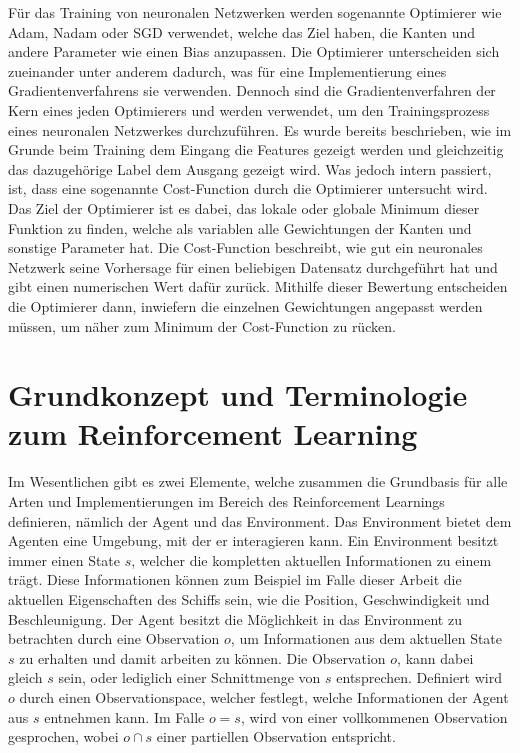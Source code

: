 \documentclass[]{iat}
\begin{document}
Für das Training von neuronalen Netzwerken werden sogenannte Optimierer wie Adam, Nadam oder SGD verwendet, welche das Ziel haben, die Kanten und andere Parameter wie einen Bias anzupassen. Die Optimierer unterscheiden sich zueinander unter anderem dadurch, was für eine Implementierung eines Gradientenverfahrens sie verwenden. Dennoch sind die Gradientenverfahren der Kern eines jeden Optimierers und werden verwendet, um den Trainingsprozess eines neuronalen Netzwerkes durchzuführen. Es wurde bereits beschrieben, wie im Grunde beim Training dem Eingang die Features gezeigt werden und gleichzeitig das dazugehörige Label dem Ausgang gezeigt wird. Was jedoch intern passiert, ist, dass eine sogenannte Cost-Function durch die Optimierer untersucht wird. Das Ziel der Optimierer ist es dabei, das lokale oder globale Minimum dieser Funktion zu finden, welche als variablen alle Gewichtungen der Kanten und sonstige Parameter hat. Die Cost-Function beschreibt, wie gut ein neuronales Netzwerk seine Vorhersage für einen beliebigen Datensatz durchgeführt hat und gibt einen numerischen Wert dafür zurück. Mithilfe dieser Bewertung entscheiden die Optimierer dann, inwiefern die einzelnen Gewichtungen angepasst werden müssen, um näher zum Minimum der Cost-Function zu rücken. \cite[]{KrusComp2015}

\newpage
\section{Grundkonzept und Terminologie zum Reinforcement Learning} \label{sec:grundkonzept_rf}
Im Wesentlichen gibt es zwei Elemente, welche zusammen die Grundbasis für alle Arten und Implementierungen im Bereich des Reinforcement Learnings definieren, nämlich der Agent und das Environment. Das Environment bietet dem Agenten eine Umgebung, mit der er interagieren kann. Ein Environment besitzt immer einen State $s$, welcher die kompletten aktuellen Informationen zu einem trägt. Diese Informationen können zum Beispiel im Falle dieser Arbeit die aktuellen Eigenschaften des Schiffs sein, wie die Position, Geschwindigkeit und Beschleunigung. Der Agent besitzt die Möglichkeit in das Environment zu betrachten durch eine Observation $o$, um Informationen aus dem aktuellen State $s$ zu erhalten und damit arbeiten zu können. Die Observation $o$, kann dabei gleich $s$ sein, oder lediglich einer Schnittmenge von $s$ entsprechen. Definiert wird $o$ durch einen Observationspace, welcher festlegt, welche Informationen der Agent aus $s$ entnehmen kann. Im Falle $o=s$, wird von einer vollkommenen Observation gesprochen, wobei $o \cap s$ einer partiellen Observation entspricht. \cite[]{SpinningUp2018} \cite[]{Sutton1998}
\end{document}
